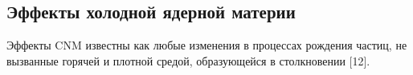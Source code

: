 
\subsection{Эффекты холодной ядерной материи}
Эффекты CNM известны как любые изменения в процессах рождения частиц, не вызванные горячей и плотной средой, образующейся в столкновении [12]. 

